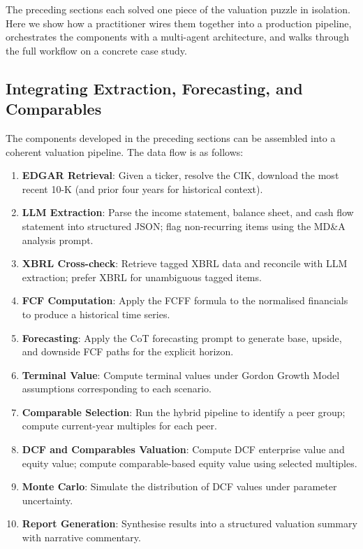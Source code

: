 \begin{context}
The preceding sections each solved one piece of the valuation puzzle in isolation.
Here we show how a practitioner wires them together into a production pipeline,
orchestrates the components with a multi-agent architecture, and walks through
the full workflow on a concrete case study.

\subsection{Integrating Extraction, Forecasting, and Comparables}
\label{subsec:bv-pipeline-integration}

The components developed in the preceding sections can be assembled into a coherent
valuation pipeline. The data flow is as follows:

\begin{enumerate}
  \item \textbf{EDGAR Retrieval}: Given a ticker, resolve the CIK, download the
        most recent 10-K (and prior four years for historical context).
  \item \textbf{LLM Extraction}: Parse the income statement, balance sheet, and
        cash flow statement into structured JSON; flag non-recurring items using the
        MD\&A analysis prompt.
  \item \textbf{XBRL Cross-check}: Retrieve tagged XBRL data and reconcile with
        LLM extraction; prefer XBRL for unambiguous tagged items.
  \item \textbf{FCF Computation}: Apply the FCFF formula to the normalised financials
        to produce a historical time series.
  \item \textbf{Forecasting}: Apply the CoT forecasting prompt to generate base,
        upside, and downside FCF paths for the explicit horizon.
  \item \textbf{Terminal Value}: Compute terminal values under Gordon Growth Model
        assumptions corresponding to each scenario.
  \item \textbf{Comparable Selection}: Run the hybrid pipeline to identify a peer group;
        compute current-year multiples for each peer.
  \item \textbf{DCF and Comparables Valuation}: Compute DCF enterprise value and
        equity value; compute comparable-based equity value using selected multiples.
  \item \textbf{Monte Carlo}: Simulate the distribution of DCF values under parameter
        uncertainty.
  \item \textbf{Report Generation}: Synthesise results into a structured valuation
        summary with narrative commentary.
\end{enumerate}


\end{context}

